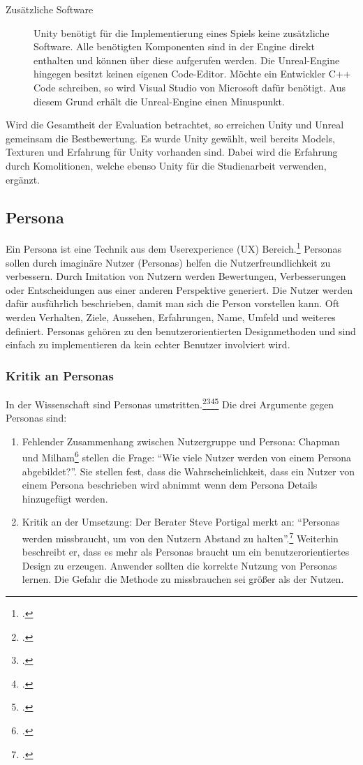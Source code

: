 \begin{description}
		\item[Zusätzliche Software]{Unity benötigt für die Implementierung eines Spiels keine zusätzliche Software. Alle benötigten Komponenten sind in der Engine direkt enthalten und können über diese aufgerufen werden. Die Unreal-Engine hingegen besitzt keinen eigenen Code-Editor. Möchte ein Entwickler C++ Code schreiben, so wird Visual Studio von Microsoft dafür benötigt. Aus diesem Grund erhält die Unreal-Engine einen Minuspunkt.}
	\end{description}
	Wird die Gesamtheit der Evaluation betrachtet, so erreichen Unity und Unreal gemeinsam die Bestbewertung. Es wurde Unity gewählt, weil bereits Models, Texturen und Erfahrung für Unity vorhanden sind. Dabei wird die Erfahrung durch Komolitionen, welche ebenso Unity für die Studienarbeit verwenden, ergänzt.

\subsection{Persona}\label{ssec:persona}
	Ein Persona ist eine Technik aus dem Userexperience (UX) Bereich.\footcite{persona} Personas sollen durch imaginäre Nutzer (Personas) helfen die Nutzerfreundlichkeit zu verbessern. Durch Imitation von Nutzern werden Bewertungen, Verbesserungen oder Entscheidungen aus einer anderen Perspektive generiert. Die Nutzer werden dafür ausführlich beschrieben, damit man sich die Person vorstellen kann. Oft werden Verhalten, Ziele, Aussehen, Erfahrungen, Name, Umfeld und weiteres definiert.
	Personas gehören zu den benutzerorientierten Designmethoden und sind einfach zu implementieren da kein echter Benutzer involviert wird.
	\subsubsection{Kritik an Personas}
		In der Wissenschaft sind Personas umstritten.\footcite{persona-crit}\footcite{persona-crit2}\footcite{persona-crit3}\footcite{persona-crit4} Die drei Argumente gegen Personas sind:
		\begin{enumerate}\obeylines
			\item{ Fehlender Zusammenhang zwischen Nutzergruppe und Persona: Chapman und Milham\footcite{persona-crit} stellen die Frage: \enquote{Wie viele Nutzer werden von einem Persona abgebildet?}. Sie stellen fest, dass die Wahrscheinlichkeit, dass ein Nutzer von einem Persona beschrieben wird abnimmt wenn dem Persona Details hinzugefügt werden. }
			\item{ Kritik an der Umsetzung: Der Berater Steve Portigal merkt an: \enquote{Personas werden missbraucht, um von den Nutzern Abstand zu halten}.\footcite[Übersetzt aus dem Orginal: \enquote{Personas are misused to maintain a “safe” distance from the people we design for [\dots]}]{persona-crit4}
			Weiterhin beschreibt er, dass es mehr als Personas braucht um ein benutzerorientiertes Design zu erzeugen. Anwender sollten die korrekte Nutzung von Personas lernen.
			Die Gefahr die Methode zu missbrauchen sei größer als der Nutzen. }
		\end{enumerate}
